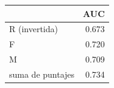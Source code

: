 \begin{tabular}{lr}
\toprule
 & AUC \\
\midrule
R (invertida) & 0.673 \\
F & 0.720 \\
M & 0.709 \\
suma de puntajes & 0.734 \\
\bottomrule
\end{tabular}
